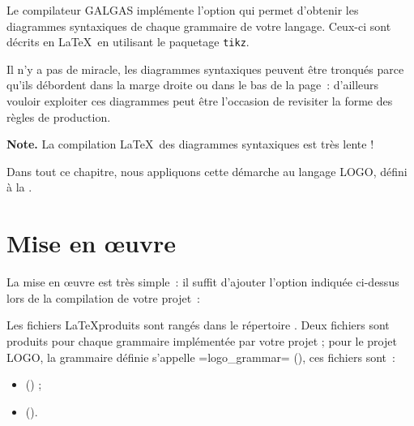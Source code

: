 



Le compilateur GALGAS implémente l'option  qui permet d'obtenir les diagrammes syntaxiques de chaque grammaire de votre langage. Ceux-ci sont décrits en \LaTeX~en utilisant le paquetage \texttt{tikz}\label{tikz}. %

Il n'y a pas de miracle, les diagrammes syntaxiques peuvent être tronqués parce qu'ils débordent dans la marge droite ou dans le bas de la page~: d'ailleurs vouloir exploiter ces diagrammes peut être l'occasion de revisiter la forme des règles de production.

{\bf Note.} La compilation \LaTeX~des diagrammes syntaxiques est très lente !

Dans tout ce chapitre, nous appliquons cette démarche au langage LOGO, défini à la .

\section{Mise en œuvre}

La mise en œuvre est très simple~: il suffit d'ajouter l'option indiquée ci-dessus lors de la compilation de votre projet~:
\begin{description}
  \item[ ] 
\end{description}

Les fichiers \LaTeX produits sont rangés dans le répertoire . Deux fichiers sont produits pour chaque grammaire implémentée par votre projet ; pour le projet LOGO, la grammaire définie s'appelle \ggs=logo_grammar= (), ces fichiers sont~:
\begin{itemize}
\item {} () ;
\item {} ().
\end{itemize}


